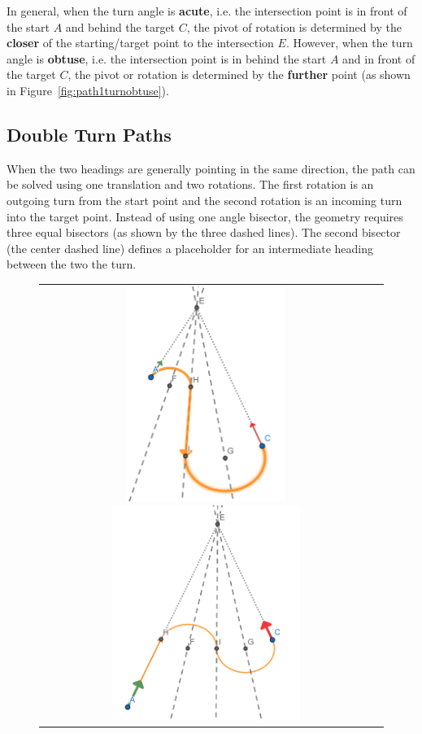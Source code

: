 \documentclass{article}
\begin{document}
In general, when the turn angle is \textbf{acute}, 
i.e. the intersection point is in front of the start $A$ and behind the target $C$, 
the pivot of rotation is determined by the \textbf{closer} 
of the starting/target point to the intersection $E$.
However, when the turn angle is \textbf{obtuse}, i.e. the intersection point is in behind the start $A$ and in front of the target $C$, 
the pivot or rotation is determined by the \textbf{further}
point (as shown in Figure~\ref{fig:path1turnobtuse}).

\clearpage
\subsection*{Double Turn Paths}
When the two headings are generally pointing in the same direction, the path can be solved using one translation
and two rotations. The first rotation is an outgoing turn from the start point and the second rotation is
an incoming turn into the target point.
Instead of using one angle bisector, the geometry requires three equal bisectors (as shown by 
the three dashed lines). The second bisector (the center dashed line) defines a placeholder for an intermediate heading 
between the two the turn.

\begin{figure}[hbt]
\begin{tabular}{cc}
  \includegraphics[height=7cm]{screenshots/double-acute-turn-rot-trans.png}
\includegraphics[height=7cm]{screenshots/double-acute-turn-trans-rot.png}
\end{tabular}
\end{figure}
\end{document}
